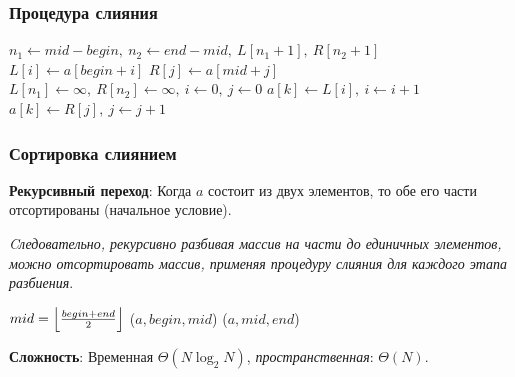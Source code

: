 \documentclass{beamer}
\DeclarePairedDelimiter\floor{\lfloor}{\rfloor}
\begin{document}
    \begin{frame}[fragile]
        \frametitle{Процедура слияния}
        \begin{algorithm}[H]
            \DontPrintSemicolon

            {
                $n_{1} \leftarrow mid - begin,\ n_{2} \leftarrow end - mid,\ L[n_{1} + 1],\ R[n_{2} + 1]$\;
                {
                    $L[i] \leftarrow a[begin + i]$\;
                }
                {
                    $R[j] \leftarrow a[mid + j]$\;
                }
                $L[n_{1}] \leftarrow \infty,\ R[n_{2}] \leftarrow \infty,\ i \leftarrow 0,\ j \leftarrow 0$\;
                {
                    {
                        $a[k] \leftarrow L[i],\ i \leftarrow i + 1$\;
                    }
                    {
                        $a[k] \leftarrow R[j],\ j \leftarrow j + 1$\;
                    }
                }
            }
        \end{algorithm}
    \end{frame}
    \begin{frame}[fragile]
        \frametitle{Сортировка слиянием}
        \justifying
        {\bf Рекурсивный переход}: Когда $a$ состоит из двух элементов, то обе его части отсортированы (начальное условие).
        \par
        {\it Cледовательно, рекурсивно разбивая массив на части до единичных элементов, можно отсортировать массив, применяя процедуру слияния для каждого этапа разбиения}.
        \par
        \vspace{0.5cm}
        \begin{algorithm}[H]
            \DontPrintSemicolon

            {
                {
                    $mid = \floor*{\frac{begin + end}{2}}$\; 
                    \FMergeSort($a, begin, mid$)\;
                    \FMergeSort($a, mid, end$)\;
                }
            }
        \end{algorithm}
        \par
        \vspace{0.5cm}
        \justifying
        {\bf Сложность}: Временная $\Theta(N \log_{2}{N})$, {\it пространственная}: $\Theta(N)$.
    \end{frame}
\end{document}

